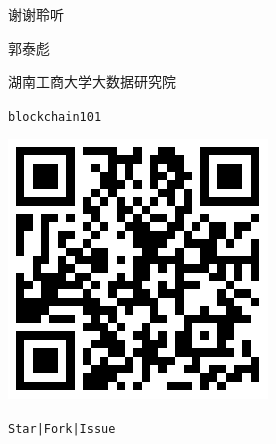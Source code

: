 \documentclass[11pt]{beamer}
\begin{document}
\begin{frame}
	\begin{minipage}[t]{0.5\linewidth}
		\begin{center}
			\begin{figure}
				\vspace{10pt}

				{\Huge 谢谢聆听}

				\vspace{30pt}
				郭泰彪

				\vspace{10pt}
				湖南工商大学大数据研究院
			\end{figure}
			\begin{figure}

			\end{figure}
		\end{center}
	\end{minipage}%
	\begin{minipage}[t]{0.4\linewidth}
		\begin{figure}
			\centering
			\faGithub\texttt{blockchain101}

			\includegraphics[width=0.6\linewidth]{figures/blockchain101qrcode}

			{\footnotesize \texttt{\faStar Star|\faCodeFork Fork|\faComments Issue}}
		\end{figure}
	\end{minipage}%
\end{frame}
\end{document}

